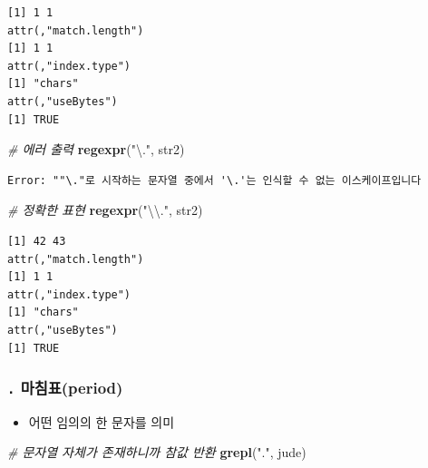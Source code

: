 \documentclass[
  11pt,
]{krantz}
\newenvironment{Shaded}{\begin{snugshade}}{\end{snugshade}}
\newcommand{\CharTok}[1]{\textcolor[rgb]{0.5,0.5,0.5}{#1}}
\newcommand{\CommentTok}[1]{\textcolor[rgb]{0.37,0.37,0.37}{\textit{#1}}}
\newcommand{\KeywordTok}[1]{\textcolor[rgb]{0.27,0.27,0.27}{\textbf{#1}}}
\newcommand{\NormalTok}[1]{#1}
\newcommand{\StringTok}[1]{\textcolor[rgb]{0.5,0.5,0.5}{#1}}
\providecommand{\tightlist}{%
  \setlength{\itemsep}{0pt}\setlength{\parskip}{0pt}}
\begin{document}
\begin{verbatim}
[1] 1 1
attr(,"match.length")
[1] 1 1
attr(,"index.type")
[1] "chars"
attr(,"useBytes")
[1] TRUE
\end{verbatim}

\normalsize

\footnotesize

\begin{Shaded}
\begin{Highlighting}[]
\CommentTok{# 에러 출력}
\KeywordTok{regexpr}\NormalTok{(}\StringTok{"\textbackslash{}."}\NormalTok{, str2)}
\end{Highlighting}
\end{Shaded}

\begin{verbatim}
Error: ""\."로 시작하는 문자열 중에서 '\.'는 인식할 수 없는 이스케이프입니다
\end{verbatim}

\normalsize

\footnotesize

\begin{Shaded}
\begin{Highlighting}[]
\CommentTok{# 정확한 표현}
\KeywordTok{regexpr}\NormalTok{(}\StringTok{"}\CharTok{\textbackslash{}\textbackslash{}}\StringTok{."}\NormalTok{, str2)}
\end{Highlighting}
\end{Shaded}

\begin{verbatim}
[1] 42 43
attr(,"match.length")
[1] 1 1
attr(,"index.type")
[1] "chars"
attr(,"useBytes")
[1] TRUE
\end{verbatim}

\normalsize

\hypertarget{period}{%
\subsubsection*{\texorpdfstring{\textbf{\texttt{.} 마침표(period)}}{. 마침표(period)}}\label{period}}


\begin{itemize}
\tightlist
\item
  어떤 임의의 한 문자를 의미
\end{itemize}

\footnotesize

\begin{Shaded}
\begin{Highlighting}[]
\CommentTok{# 문자열 자체가 존재하니까 참값 반환}
\KeywordTok{grepl}\NormalTok{(}\StringTok{"."}\NormalTok{, jude) }
\end{Highlighting}
\end{Shaded}
\end{document}
